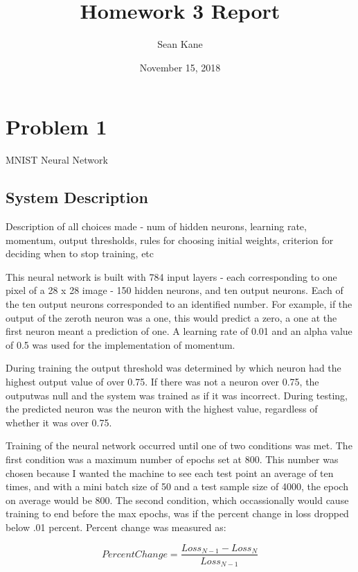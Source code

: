 \documentclass[12pt, letterpaper, twoside]{article}
\title{Homework 3 Report}
\date{November 15, 2018}
\author{Sean Kane}
\begin{document}
\maketitle
\section{Problem 1}
MNIST Neural Network

\subsection{System Description}
Description of all choices made - num of hidden neurons, learning rate, momentum, output thresholds, 
rules for choosing initial weights, criterion for deciding when to stop training, etc

This neural network is built with 784 input layers - each corresponding to one pixel of a 28 x 28 
image - 150 hidden neurons, and ten output neurons. Each of the ten output neurons corresponded to an
identified number. For example, if the output of the zeroth neuron was a one, this would predict a 
zero, a one at the first neuron meant a prediction of one. A learning rate of 0.01 and an alpha value 
of 0.5 was used for the implementation of momentum. 

During training the output threshold was determined by which neuron had the highest output value of 
over 0.75. If there was not a neuron over 0.75, the outputwas null and the system was trained as if 
it was incorrect. During testing, the predicted neuron was the neuron with the highest value, regardless
of whether it was over 0.75. 

Training of the neural network occurred until one of two conditions was met. The first condition was a 
maximum number of epochs set at 800. This number was chosen because I wanted the machine to see each 
test point an average of ten times, and with a mini batch size of 50 and a test sample size of 4000, 
the epoch on average would be 800. The second condition, which occassionally would cause training to end
before the max epochs, was if the percent change in loss dropped below .01 percent. Percent change was 
measured as:
        
\[
    PercentChange = \frac{  Loss_{N-1} - Loss_{N}  }{ Loss_{N-1}   }%
\]
\end{document}
